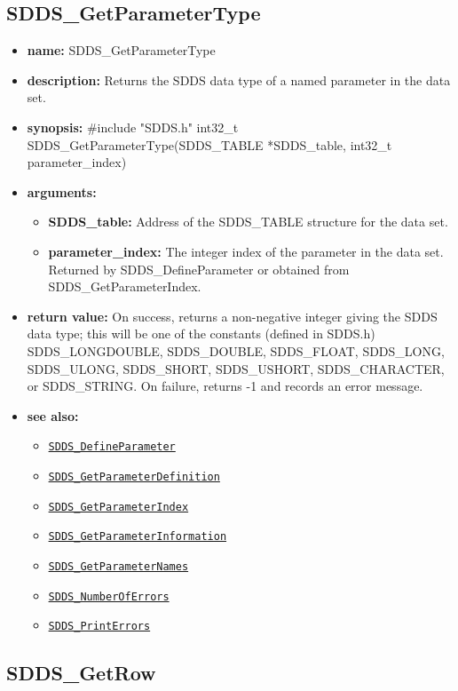 \documentclass[11pt]{article}
\newcommand{\progref}[1]{\hyperref[SDDS_#1]{\tt SDDS\_#1}}
\begin{document}
\subsection{SDDS\_GetParameterType}
\label{SDDS_GetParameterType}

\begin{itemize}
\item {\bf name:}\newline
SDDS\_GetParameterType
\item {\bf description:}\newline
Returns the SDDS data type of a named parameter in the data set.
\item {\bf synopsis:} \#include "SDDS.h"\newline
int32\_t SDDS\_GetParameterType(SDDS\_TABLE *SDDS\_table, int32\_t parameter\_index)
\item {\bf arguments:}
\begin{itemize}
\item {\bf SDDS\_table:} Address of the SDDS\_TABLE structure for the data set.
\item {\bf parameter\_index:} The integer index of the parameter in the data set. Returned by SDDS\_DefineParameter or obtained from SDDS\_GetParameterIndex.
\end{itemize}
\item {\bf return value:}\newline
On success, returns a non-negative integer giving the SDDS data type; this will be one of the constants (defined in SDDS.h) SDDS\_LONGDOUBLE, SDDS\_DOUBLE, SDDS\_FLOAT, SDDS\_LONG, SDDS\_ULONG, SDDS\_SHORT, SDDS\_USHORT, SDDS\_CHARACTER, or SDDS\_STRING. On failure, returns -1 and records an error message.
\item {\bf see also:}
\begin{itemize}
\item \progref{DefineParameter}
\item \progref{GetParameterDefinition}
\item \progref{GetParameterIndex}
\item \progref{GetParameterInformation}
\item \progref{GetParameterNames}
\item \progref{NumberOfErrors}
\item \progref{PrintErrors}
\end{itemize}
\end{itemize}

\subsection{SDDS\_GetRow}
\label{SDDS_GetRow}
\end{document}
